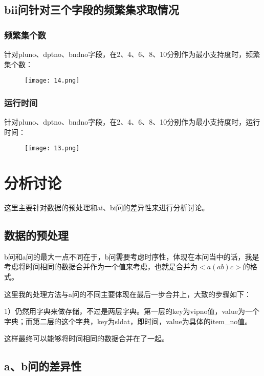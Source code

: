 \documentclass{article}
\begin{document}
\begin{CJK}{UTF8}{gbsn}
\subsection{bii问针对三个字段的频繁集求取情况}
\subsubsection{频繁集个数}
针对pluno、dptno、bndno字段，在2、4、6、8、10分别作为最小支持度时，频繁集个数：


\begin{figure}[!h]
\begin{center}
  \texttt{[image: 14.png]}	
\end{center}
\end{figure}

\subsubsection{运行时间}
针对pluno、dptno、bndno字段，在2、4、6、8、10分别作为最小支持度时，运行时间：
\clearpage
\begin{figure}[!h]
\begin{center}
  \texttt{[image: 13.png]}	
\end{center}
\end{figure}

\section{分析讨论}
这里主要针对数据的预处理和ai、bi问的差异性来进行分析讨论。


\subsection{数据的预处理}
b问和a问的最大一点不同在于，b问需要考虑时序性，体现在本问当中的话，我是考虑将时间相同的数据合并作为一个值来考虑，也就是合并为$<a(ab)c>$的格式。

这里我的处理方法与a问的不同主要体现在最后一步合并上，大致的步骤如下：

1）仍然用字典来做存储，不过是两层字典。第一层的key为vipno值，value为一个字典；而第二层的这个字典，key为sldat，即时间，value为具体的item\_no值。

这样最终可以能够将时间相同的数据合并在了一起。


\subsection{a、b问的差异性}


\end{CJK}
\end{document}
